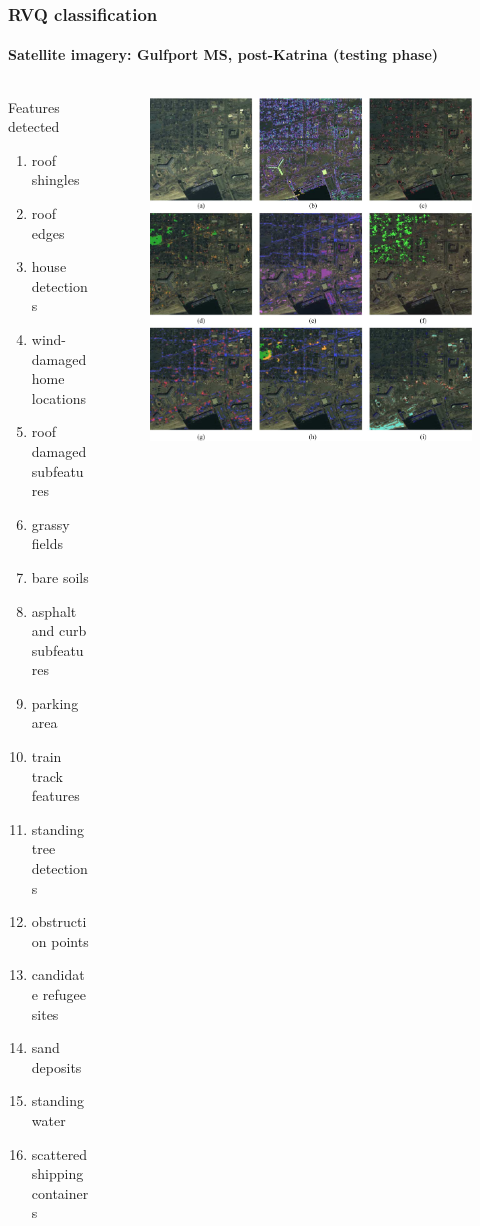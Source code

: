 \begin{frame}[plain]
\frametitle{RVQ classification}
\framesubtitle{\small Satellite imagery: Gulfport MS, post-Katrina (testing phase)}
\mypagenum
	\begin{columns}
		\begin{column}{0.8in}
			\begin{changemargin}{-1.3in}{0in}
				Features detected
				\begin{enumerate}\small
					\item roof shingles
					\item roof edges
					\item house detections
					\item wind-damaged home locations
					\item roof damaged subfeatures
					\item grassy fields
					\item bare soils
					\item asphalt and curb subfeatures
					\item parking area
					\item train track features
					\item standing tree detections
					\item obstruction points
					\item candidate refugee sites
					\item sand deposits
					\item standing water
					\item scattered shipping containers
				\end{enumerate}
			\end{changemargin}
		\end{column}
	\begin{column}{2.8in}
			\begin{figure}		
				\includegraphics[height=0.8\textheight]{figs/RVQ_SatelliteKatrina_3_labeling.png}

\end{figure}
\end{column}
\end{columns}
\end{frame}
